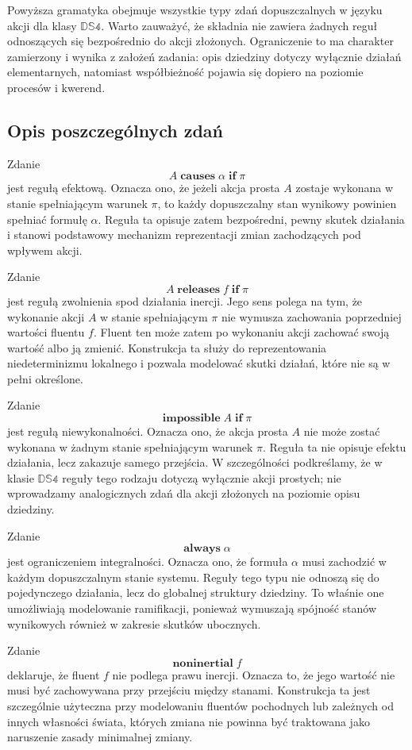 \documentclass[11pt,a4paper]{article}
\theoremstyle{definition}
\begin{document}
Powyższa gramatyka obejmuje wszystkie typy zdań dopuszczalnych w języku akcji dla klasy $\mathbb{DS4}$. Warto zauważyć, że składnia nie zawiera żadnych reguł odnoszących się bezpośrednio do akcji złożonych. Ograniczenie to ma charakter zamierzony i wynika z założeń zadania: opis dziedziny dotyczy wyłącznie działań elementarnych, natomiast współbieżność pojawia się dopiero na poziomie procesów i kwerend.

\subsection{Opis poszczególnych zdań}

Zdanie
\[
A \;\textbf{causes}\; \alpha \;\textbf{if}\; \pi
\]
jest regułą efektową. Oznacza ono, że jeżeli akcja prosta $A$ zostaje wykonana w stanie spełniającym warunek $\pi$, to każdy dopuszczalny stan wynikowy powinien spełniać formułę $\alpha$. Reguła ta opisuje zatem bezpośredni, pewny skutek działania i stanowi podstawowy mechanizm reprezentacji zmian zachodzących pod wpływem akcji.

Zdanie
\[
A \;\textbf{releases}\; f \;\textbf{if}\; \pi
\]
jest regułą zwolnienia spod działania inercji. Jego sens polega na tym, że wykonanie akcji $A$ w stanie spełniającym $\pi$ nie wymusza zachowania poprzedniej wartości fluentu $f$. Fluent ten może zatem po wykonaniu akcji zachować swoją wartość albo ją zmienić. Konstrukcja ta służy do reprezentowania niedeterminizmu lokalnego i pozwala modelować skutki działań, które nie są w pełni określone.

Zdanie
\[
\textbf{impossible}\; A \;\textbf{if}\; \pi
\]
jest regułą niewykonalności. Oznacza ono, że akcja prosta $A$ nie może zostać wykonana w żadnym stanie spełniającym warunek $\pi$. Reguła ta nie opisuje efektu działania, lecz zakazuje samego przejścia. W szczególności podkreślamy, że w klasie $\mathbb{DS4}$ reguły tego rodzaju dotyczą wyłącznie akcji prostych; nie wprowadzamy analogicznych zdań dla akcji złożonych na poziomie opisu dziedziny.

Zdanie
\[
\textbf{always}\; \alpha
\]
jest ograniczeniem integralności. Oznacza ono, że formuła $\alpha$ musi zachodzić w każdym dopuszczalnym stanie systemu. Reguły tego typu nie odnoszą się do pojedynczego działania, lecz do globalnej struktury dziedziny. To właśnie one umożliwiają modelowanie ramifikacji, ponieważ wymuszają spójność stanów wynikowych również w zakresie skutków ubocznych.

Zdanie
\[
\textbf{noninertial}\; f
\]
deklaruje, że fluent $f$ nie podlega prawu inercji. Oznacza to, że jego wartość nie musi być zachowywana przy przejściu między stanami. Konstrukcja ta jest szczególnie użyteczna przy modelowaniu fluentów pochodnych lub zależnych od innych własności świata, których zmiana nie powinna być traktowana jako naruszenie zasady minimalnej zmiany.
\end{document}
